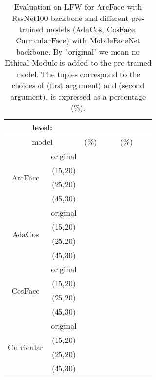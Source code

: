\documentclass[nohyperref]{article}
\theoremstyle{plain}
\theoremstyle{definition}
\theoremstyle{remark}
\begin{document}
\begin{table*}
\center
\caption{Evaluation on LFW for ArcFace with ResNet100 backbone and different pre-trained models (AdaCos, CosFace, CurricularFace) with MobileFaceNet backbone. By "original" we mean no Ethical Module is added to the pre-trained model. The tuples correspond to the choices of  (first argument) and  (second argument).  is expressed as a percentage (\%).}
\begin{tabular}{ c | c | ccc | ccc}
 \multicolumn{2}{c}{  level: }         & \multicolumn{3}{c}{ } & \multicolumn{3}{c}{ } \\ 
 \hline \hline
  \multicolumn{2}{c}{ model }    &  (\%)  &   &   &  (\%)  &         &         \\ \hline
                              & original  &   &  &   &    &   &  \\
  \multirow{2}{*}{ArcFace}    & (15,20) &   &  &   &  &  &   \\
                              & (25,20) &  &  &  &  &   &  \\
                              & (45,30) &   &  &  &  &   &   \\ \hline   \hline   
                              & original  &  &  &  &   &  &  \\
  \multirow{2}{*}{AdaCos}     & (15,20) &  &  &   &  &  &   \\
                              & (25,20) &  &  &  &  &   &  \\
                              & (45,30) &  &   &  &  &  &   \\ \hline 
                              & original  &  &  &  &   &   &   \\
\multirow{2}{*}{CosFace}  & (15,20) &  &  &   &  &  &   \\
                              & (25,20) &  &  &  &  &   &  \\
                              & (45,30) &  &  &  &  &  &  \\ \hline 
                              & original  &  &  &  &   &  &   \\
  \multirow{2}{*}{Curricular} & (15,20) &  &  &   &  &   &   \\
                              & (25,20) &  &  &  &  &   &  \\
                              & (45,30) &  &  &  &  &  &   \\ \hline 
\end{tabular}
\label{tab:table4}
\end{table*}
\end{document}
